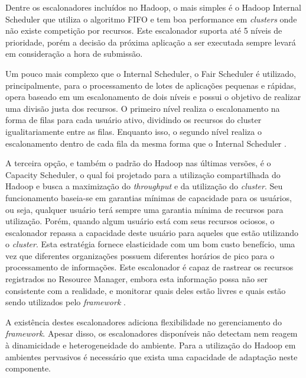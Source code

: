 Dentre os escalonadores incluídos no Hadoop, o mais simples é o Hadoop Internal Scheduler que utiliza o algoritmo FIFO e tem boa performance em \textit{clusters} onde não existe competição por recursos. Este escalonador suporta até 5 níveis de prioridade, porém a decisão da próxima aplicação a ser executada sempre levará em consideração a hora de submissão.

Um pouco mais complexo que o Internal Scheduler, o Fair Scheduler é utilizado, principalmente, para o processamento de lotes de aplicações pequenas e rápidas, opera baseado em um escalonamento de dois níveis e possui o objetivo de realizar uma divisão justa dos recursos. O primeiro nível realiza o escalonamento na forma de filas para cada usuário ativo, dividindo os recursos do cluster igualitariamente entre as filas. Enquanto isso, o segundo nível realiza o escalonamento dentro de cada fila da mesma forma que o Internal Scheduler \cite{FairScheduler}. 

A terceira opção, e também o padrão do Hadoop nas últimas versões, é o Capacity Scheduler, o qual foi projetado para a utilização compartilhada do Hadoop e busca a maximização do \textit{throughput} e da utilização do \textit{cluster}. Seu funcionamento baseia-se em garantias mínimas de capacidade para os usuários, ou seja, qualquer usuário terá sempre uma garantia mínima de recursos para utilização. Porém, quando algum usuário está com seus recursos ociosos, o escalonador repassa a capacidade deste usuário  para aqueles que estão utilizando o \textit{cluster}. Esta estratégia fornece elasticidade com um bom custo benefício, uma vez que diferentes organizações possuem diferentes horários de pico para o processamento de informações. Este escalonador é capaz de rastrear os recursos registrados no Resource Manager, embora esta informação possa não ser consistente com a realidade, e monitorar quais deles estão livres e quais estão sendo utilizados pelo \textit{framework} \cite{CapacityScheduler}.


A existência destes escalonadores adiciona flexibilidade no gerenciamento do \textit{framework}. Apesar disso, os escalonadores disponíveis não detectam nem reagem à dinamicidade e heterogeneidade do ambiente. Para a utilização do Hadoop em ambientes pervasivos é necessário que exista uma capacidade de adaptação neste componente.






